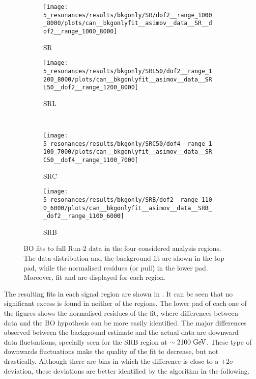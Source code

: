 \begin{figure}[ht!]
    \centering
    \begin{subfigure}[h]{0.49\linewidth}
        \centering
        \texttt{[image: 5\_resonances/results/bkgonly/SR/dof2\_\_range\_1000\_8000/plots/can\_\_bkgonlyfit\_\_asimov\_\_data\_\_SR\_\_dof2\_\_range\_1000\_8000]}
        \caption{SR}
        \label{fig:results:results:bkgonly:fits:SR}
    \end{subfigure}
    \hfill
    \begin{subfigure}[h]{0.49\linewidth}
        \centering
        \texttt{[image: 5\_resonances/results/bkgonly/SRL50/dof2\_\_range\_1200\_8000/plots/can\_\_bkgonlyfit\_\_asimov\_\_data\_\_SRL50\_\_dof2\_\_range\_1200\_8000]}
        \caption{SRL}
        \label{fig:results:results:bkgonly:fits:SRL50}
    \end{subfigure}\\
    \begin{subfigure}[h]{0.49\linewidth}
        \centering
        \texttt{[image: 5\_resonances/results/bkgonly/SRC50/dof4\_\_range\_1100\_7000/plots/can\_\_bkgonlyfit\_\_asimov\_\_data\_\_SRC50\_\_dof4\_\_range\_1100\_7000]}
        \caption{SRC}
        \label{fig:results:results:bkgonly:fits:SRC}
    \end{subfigure}
    \hfill
    \begin{subfigure}[h]{0.49\linewidth}
        \centering
        \texttt{[image: 5\_resonances/results/bkgonly/SRB/dof2\_\_range\_1100\_6000/plots/can\_\_bkgonlyfit\_\_asimov\_\_data\_\_SRB\_\_dof2\_\_range\_1100\_6000]}
        \caption{SRB}
        \label{fig:results:results:bkgonly:fits:SRB}
    \end{subfigure}
    \caption{\ac{BO} fits to full Run-2 data in the four considered analysis regions. The data distribution and the background fit are shown in the top pad, while the normalised residues (or pull) in the lower pad. Moreover, fit \chisq and \pval are displayed for each region.}
    \label{fig:results:results:bkgonly:fits}
\end{figure}

The resulting fits in each signal region are shown in \Fig{\ref{fig:results:results:bkgonly:fits}}. It can be seen that no significant excess is found in neither of the regions. The lower pad of each one of the figures shows the normalised residues of the fit, where differences between data and the \ac{BO} hypothesis can be more easily identified. The major differences observed between the background estimate and the actual data are downward data fluctuations, specially seen for the SRB region at \(\sim 2100~\text{GeV}\). These type of downwards fluctuations make the quality of the fit to decrease, but not drastically.
Although there are bins in which the difference is close to a \(+2\sigma\) deviation, these deviations are better identified by the \bh algorithm in the following.

